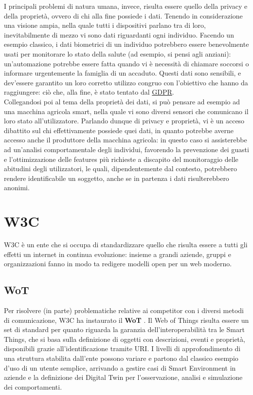 \documentclass[12pt,a4paper,openright,oneside]{report}
\begin{document}
I principali problemi di natura umana, invece, risulta essere quello della privacy e della proprietà, ovvero di chi alla fine possiede i dati. Tenendo in considerazione una visione ampia, nella quale tutti i dispositivi parlano tra di loro, inevitabilmente di mezzo vi sono dati riguardanti ogni individuo. Facendo un esempio classico, i dati biometrici di un individuo potrebbero essere benevolmente usati per monitorare lo stato della salute (ad esempio, si pensi agli anziani): un'automazione potrebbe essere fatta quando vi è necessità di chiamare soccorsi o informare urgentemente la famiglia di un accaduto. Questi dati sono sensibili, e dev'essere garantito un loro corretto utilizzo congruo con l'obiettivo che hanno da raggiungere: ciò che, alla fine, è stato tentato dal \href{https://eur-lex.europa.eu/legal-content/IT/TXT/?uri=uriserv:OJ.L_.2016.119.01.0001.01.ITA&toc=OJ:L:2016:119:TOC}{GDPR}.\\

Collegandosi poi al tema della proprietà dei dati, si può pensare ad esempio ad una macchina agricola smart, nella quale vi sono diversi sensori che comunicano il loro stato all'utilizzatore. Parlando dunque di privacy e proprietà, vi è un acceso dibattito sul chi effettivamente possiede quei dati, in quanto potrebbe averne accesso anche il produttore della macchina agricola: in questo caso si assisterebbe ad un'analisi comportamentale degli individui, favorendo la prevenzione dei guasti e l'ottimizzazione delle features più richieste a discapito del monitoraggio delle abitudini degli utilizzatori, le quali, dipendentemente dal contesto, potrebbero rendere identificabile un soggetto, anche se in partenza i dati risulterebbero anonimi.\\


\section{W3C}
\label{sec:w3c}
W3C \cite{w3c} è un ente che si occupa di standardizzare quello che risulta essere a tutti gli effetti un internet in continua evoluzione: insieme a grandi aziende, gruppi e organizzazioni fanno in modo ta redigere modelli open per un web moderno.

\subsection{WoT}
\label{sec:wot}
Per risolvere (in parte) problematiche relative ai competitor con i diversi metodi di comunicazione, W3C ha instaurato il \textbf{WoT} \cite{wot}. Il Web of Things risulta essere un set di standard per quanto riguarda la garanzia dell'interoperabilità tra le Smart Things, che si basa sulla definizione di oggetti con descrizioni, eventi e proprietà, disponibili grazie all'identificazione tramite URI. I livelli di approfondimento di una struttura stabilita dall'ente possono variare e partono dal classico esempio d'uso di un utente semplice, arrivando a gestire casi di Smart Environment in aziende e la definizione dei Digital Twin per l'osservazione, analisi e simulazione dei comportamenti.\\
\end{document}
